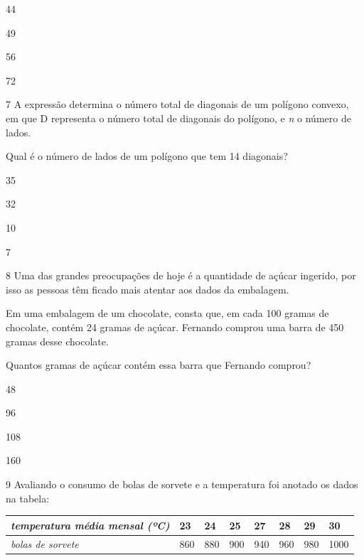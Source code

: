 \begin{multicols}{2}
\begin{escolha}

\item
  44
\item
  49
\item
  56
\item
  72
\end{escolha}
\end{multicols}

\pagebreak
\num{7} A expressão determina o número total de diagonais de um polígono convexo, em que D representa o número total de diagonais do polígono, e \emph{n} o número de lados. 

Qual é o número de lados de um polígono que tem 14 diagonais?

\begin{escolha}
\item 35

\item 32

\item 10

\item 7
\end{escolha}



\num{8} Uma das grandes preocupações de hoje é a quantidade de açúcar ingerido, por isso as pessoas têm ficado mais atentar aos dados da embalagem.

Em uma embalagem de um chocolate, consta que, em cada 100 gramas de
chocolate, contém 24 gramas de açúcar. Fernando comprou uma barra de 450
gramas desse chocolate.

Quantos gramas de açúcar contém essa barra que Fernando comprou?

\begin{escolha}
\item 48 

\item 96 

\item 108 

\item 160
\end{escolha}

\num{9} Avaliando o consumo de bolas de sorvete e a temperatura foi anotado
os dados na tabela:

\begin{longtable}[]{@{}llllllll@{}}
\toprule\noalign{}
\emph{temperatura média mensal (ºC)} & \textbf{23} & \textbf{24} &
\textbf{25} & \textbf{27} & \textbf{28} & \textbf{29} & \textbf{30} \\
\midrule\noalign{}
\endhead
\bottomrule\noalign{}
\endlastfoot
\emph{bolas de sorvete} & 860 & 880 & 900 & 940 & 960 & 980 & 1000 \\
\end{longtable}


